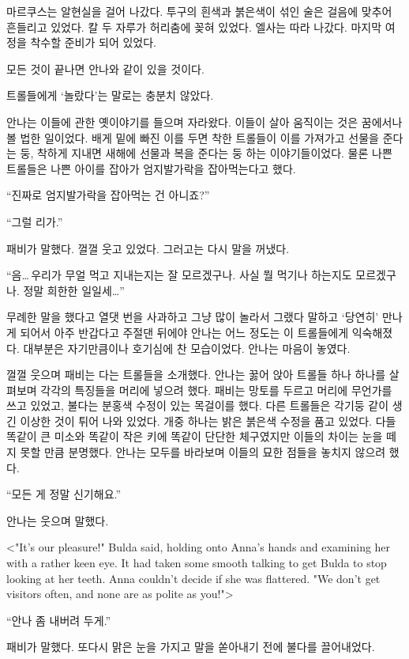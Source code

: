 마르쿠스는 알현실을 걸어 나갔다. 투구의 흰색과 붉은색이 섞인 술은 걸음에 맞추어 흔들리고 있었다. 칼 두 자루가 허리춤에 꽂혀 있었다. 엘사는 따라 나갔다. 마지막 여정을 착수할 준비가 되어 있었다.

모든 것이 끝나면 안나와 같이 있을 것이다.

\textbreak

트롤들에게 `놀랐다'는 말로는 충분치 않았다.

안나는 이들에 관한 옛이야기를 들으며 자라왔다. 이들이 살아 움직이는 것은 꿈에서나 볼 법한 일이었다. 배게 밑에 빠진 이를 두면 착한 트롤들이 이를 가져가고 선물을 준다는 둥, 착하게 지내면 새해에 선물과 복을 준다는 둥 하는 이야기들이었다. 물론 나쁜 트롤들은 나쁜 아이를 잡아가 엄지발가락을 잡아먹는다고 했다.

``진짜로 엄지발가락을 잡아먹는 건 아니죠?''

``그럴 리가.''

패비가 말했다. 껄껄 웃고 있었다. 그러고는 다시 말을 꺼냈다.

``음\ldots\,우리가 무얼 먹고 지내는지는 잘 모르겠구나. 사실 뭘 먹기나 하는지도 모르겠구나. 정말 희한한 일일세\ldots''

무례한 말을 했다고 열댓 번을 사과하고 그냥 많이 놀라서 그랬다 말하고 `당연히' 만나게 되어서 아주 반갑다고 주절댄 뒤에야 안나는 어느 정도는 이 트롤들에게 익숙해졌다. 대부분은 자기만큼이나 호기심에 찬 모습이었다. 안나는 마음이 놓였다.

껄껄 웃으며 패비는 다는 트롤들을 소개했다. 안나는 꿇어 앉아 트롤들 하나 하나를 살펴보며 각각의 특징들을 머리에 넣으려 했다. 패비는 망토를 두르고 머리에 무언가를 쓰고 있었고, 불다는 분홍색 수정이 있는 목걸이를 했다. 다른 트롤들은 각기둥 같이 생긴 이상한 것이 튀어 나와 있었다. 개중 하나는 밝은 붉은색 수정을 품고 있었다. 다들 똑같이 큰 미소와 똑같이 작은 키에 똑같이 단단한 체구였지만 이들의 차이는 눈을 떼지 못할 만큼 분명했다. 안나는 모두를 바라보며 이들의 묘한 점들을 놓치지 않으려 했다.

``모든 게 정말 신기해요.''

안나는 웃으며 말했다.

<"It's our pleasure!" Bulda said, holding onto Anna's hands and examining her with a rather keen eye. It had taken some smooth talking to get Bulda to stop looking at her teeth. Anna couldn't decide if she was flattered. "We don't get visitors often, and none are as polite as you!">

``안나 좀 내버려 두게.''

패비가 말했다. 또다시 맑은 눈을 가지고 말을 쏟아내기 전에 불다를 끌어내었다.

